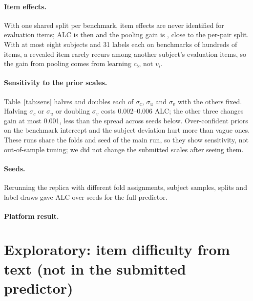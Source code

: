 \documentclass{article}
\begin{document}
\paragraph{Item effects.} With one shared split per benchmark, item effects are never identified for evaluation items; ALC is then \AlcOursShared{} and the pooling gain is \DiffPoolShared{}, close to the per-pair split. With at most eight subjects and 31 labels each on benchmarks of hundreds of items, a revealed item rarely recurs among another subject's evaluation items, so the gain from pooling comes from learning $c_b$, not $v_i$.

\paragraph{Sensitivity to the prior scales.} Table~\ref{tab:sens} halves and doubles each of $\sigma_c$, $\sigma_u$ and $\sigma_v$ with the others fixed. Halving $\sigma_c$ or $\sigma_u$ or doubling $\sigma_v$ costs 0.002--0.006 ALC; the other three changes gain at most 0.001, less than the spread across seeds below. Over-confident priors on the benchmark intercept and the subject deviation hurt more than vague ones. These runs share the folds and seed of the main run, so they show sensitivity, not out-of-sample tuning; we did not change the submitted scales after seeing them.

\begin{table}[t]
  \caption{Brier ALC of the full predictor when one prior scale is multiplied by 0.5 or 2 (local replica, same folds and seed as Table~\ref{tab:main}).}
  \label{tab:sens}
  \centering
  \small
  
\end{table}

\paragraph{Seeds.} Rerunning the replica with different fold assignments, subject samples, splits and label draws gave ALC \SeedRange{} over \NSeeds{} seeds for the full predictor.

\paragraph{Platform result.} \OnlineResult

\section{Exploratory: item difficulty from text (not in the submitted predictor)}
\label{sec:explore}
\end{document}
